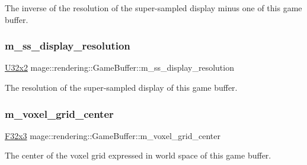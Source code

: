 The inverse of the resolution of the super-\/sampled display minus one of this game buffer. \hypertarget{structmage_1_1rendering_1_1_game_buffer_a76b01da64f8eb8f7ba431371a71d35a4}{}\label{structmage_1_1rendering_1_1_game_buffer_a76b01da64f8eb8f7ba431371a71d35a4} 
\subsubsection{\texorpdfstring{m\+\_\+ss\+\_\+display\+\_\+resolution}{m\_ss\_display\_resolution}}
{\footnotesize\ttfamily \hyperlink{namespacemage_a88e05bff0300120c013285d3dcad95c5}{U32x2} mage\+::rendering\+::\+Game\+Buffer\+::m\+\_\+ss\+\_\+display\+\_\+resolution}

The resolution of the super-\/sampled display of this game buffer. \hypertarget{structmage_1_1rendering_1_1_game_buffer_a4dddeeb0f0bfb8cdb328338657910f3c}{}\label{structmage_1_1rendering_1_1_game_buffer_a4dddeeb0f0bfb8cdb328338657910f3c} 
\subsubsection{\texorpdfstring{m\+\_\+voxel\+\_\+grid\+\_\+center}{m\_voxel\_grid\_center}}
{\footnotesize\ttfamily \hyperlink{namespacemage_a73fbe0da4b8d5bc156bb8453e5b63a17}{F32x3} mage\+::rendering\+::\+Game\+Buffer\+::m\+\_\+voxel\+\_\+grid\+\_\+center}

The center of the voxel grid expressed in world space of this game buffer. \hypertarget{structmage_1_1rendering_1_1_game_buffer_a613f32740ac3e7f6b1e32f9976447b22}{}\label{structmage_1_1rendering_1_1_game_buffer_a613f32740ac3e7f6b1e32f9976447b22} 
